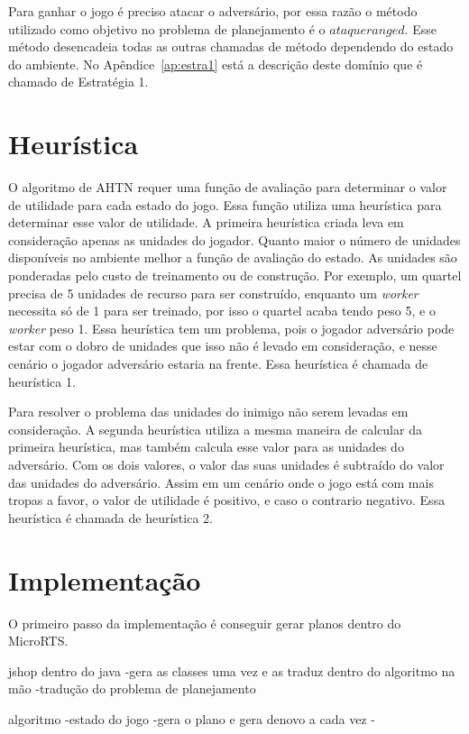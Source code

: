 Para ganhar o jogo é preciso atacar o adversário, por essa razão o método utilizado como objetivo no problema de planejamento é o $ataqueranged$.
Esse método desencadeia todas as outras chamadas de método dependendo do estado do ambiente.
No Apêndice~\ref{ap:estra1} está a descrição deste domínio que é chamado de Estratégia 1.

\section{Heurística}

O algoritmo de AHTN requer uma função de avaliação para determinar o valor de utilidade para cada estado do jogo.
Essa função utiliza uma heurística para determinar esse valor de utilidade.
A primeira heurística criada leva em consideração apenas as unidades do jogador.
Quanto maior o número de unidades disponíveis no ambiente melhor a função de avaliação do estado.
As unidades são ponderadas pelo custo de treinamento ou de construção.
Por exemplo, um quartel precisa de 5 unidades de recurso para ser construído, enquanto um \textit{worker} necessita só de 1 para ser treinado, por isso o quartel acaba tendo peso 5, e o \textit{worker} peso 1. 
Essa heurística tem um problema, pois o jogador adversário pode estar com o dobro de unidades que isso não é levado em consideração, e nesse cenário o jogador adversário estaria na frente. 
Essa heurística é chamada de heurística 1.

Para resolver o problema das unidades do inimigo não serem levadas em consideração.
A segunda heurística utiliza a mesma maneira de calcular da primeira heurística, mas também calcula esse valor para as unidades do adversário. 
Com os dois valores, o valor das suas unidades é subtraído do valor das unidades do adversário. 
Assim em um cenário onde o jogo está com mais tropas a favor, o valor de utilidade é positivo, e caso o contrario negativo.
Essa heurística é chamada de heurística 2.

\section{Implementação}

O primeiro passo da implementação é conseguir gerar planos dentro do MicroRTS.

jshop dentro do java
-gera as classes uma vez e as traduz dentro do algoritmo na mão
-tradução do problema de planejamento


algoritmo
	-estado do jogo
	-gera o plano e gera denovo a cada vez
	-

	
